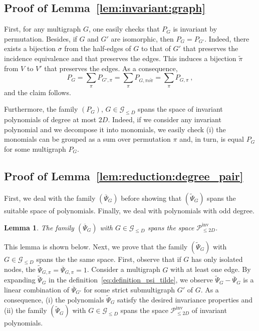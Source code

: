 \documentclass{article}
\newtheorem{lemma}{Lemma}
\begin{document}
\subsection{Proof of Lemma~\ref{lem:invariant:graph}}

    First, for any multigraph $G$, one easily checks that $P_{G}$ is invariant by permutation.  Besides, if $G$ and $G'$ are isomorphic, then $P_{G}=P_{G'}$. Indeed, there exists a bijection $\sigma$ from the half-edges of $G$ to that of $G'$ that preserves the incidence equivalence and that preserves the edges. This induces a bijection $\tilde{\pi}$ from $V$ to $V'$ that preserves the edges. As a consequence, 
    \[
    P_{G}= \sum_{\pi}P_{G',\pi}= \sum_{\pi}P_{G,\pi o \tilde{\pi}}= \sum_{\pi}P_{G,\pi}\ , 
    \]
    and the claim  follows. 

    Furthermore, the family $(P_G)$, $G\in \mathcal{G}_{\leq D}$ spans the space of invariant polynomials of degree at most $2D$. Indeed, if we consider any invariant polynomial and we decompose it into monomials, we easily check (i) the monomials can be grouped as a sum over permutation $\pi$ and, in turn, is equal $P_G$ for some multigraph $P_G$. 





\subsection{Proof of Lemma~\ref{lem:reduction:degree_pair}}

First, we deal with the family $(\overline{\Psi}_G)$ before showing that $(\widetilde{\Psi}_G)$ spans the suitable space of polynomials. Finally, we deal with polynomials with odd degree.  


\begin{lemma}\label{lem:reduction:psi_bar}
The family $(\overline{\Psi}_G)$ with $G\in \mathcal{G}_{\leq D}$ spans the space $\mathcal{P}^{\mathrm{\mathrm{inv}}}_{\leq 2D}$.
\end{lemma}

This lemma is shown below. Next, we prove that the family $(\widetilde{\Psi}_G)$ with $G\in \mathcal{G}_{\leq D}$ spans the the same space. First, observe that if $G$ has only isolated nodes, the  $\widetilde{\Psi}_{G,\pi}= \overline{\Psi}_{G,\pi}=1$.  Consider a multigraph $G$ with at least one edge. By expanding $\widetilde{\Psi}_G$ in the definition~\eqref{eq:definition_psi_tilde}, we observe $\widetilde{\Psi}_G- \overline{\Psi}_G$ is a linear combination of $\overline{\Psi}_{G'}$ for some strict submultigraph $G'$ of $G$. As a consequence, (i)  the polynomials $\widetilde{\Psi}_G$ satisfy the desired invariance properties and (ii) the family $(\widetilde{\Psi}_{G})$ with $G\in \mathcal{G}_{\leq D}$ spans the space $\mathcal{P}^{\mathrm{\mathrm{inv}}}_{\leq 2D}$ of invariant polynomials. 
\end{document}
